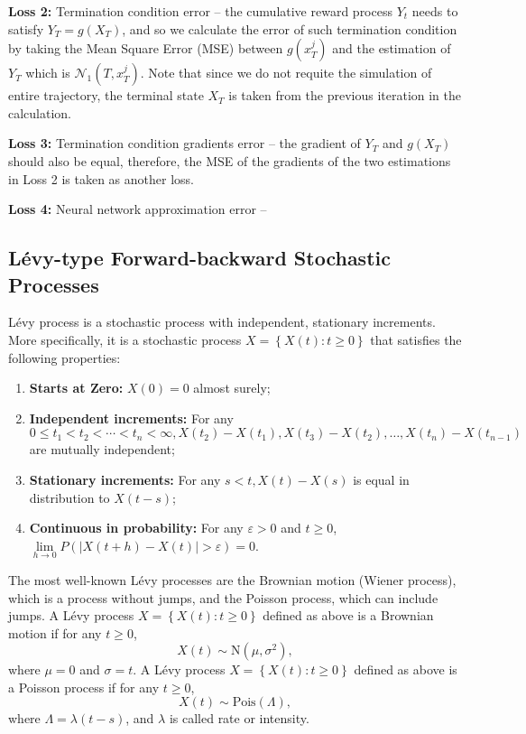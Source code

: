 \documentclass[12pt,letterpaper,oneside]{article}
\begin{document}
	\textbf{Loss 2: } Termination condition error -- the cumulative reward process $ Y_t $ needs to satisfy $ Y_T = g(X_T) $, and so we calculate the error of such termination condition by taking the Mean Square Error (MSE) between $ g(x_T^j) $ and the estimation of $ Y_T $ which is $ \mathcal{N}_1(T,x_T^j) $. Note that since we do not requite the simulation of entire trajectory, the terminal state $ X_T $ is taken from the previous iteration in the calculation. 
	
	\textbf{Loss 3: } Termination condition gradients error -- the gradient of $ Y_T $ and $ g(X_T) $ should also be equal, therefore, the MSE of the gradients of the two estimations in Loss 2 is taken as another loss.
	
	\textbf{Loss 4: } Neural network approximation error -- 
	
	
\subsection{L\'evy-type Forward-backward Stochastic Processes}
	L\'evy process is a stochastic process with independent, stationary increments. More specifically, it is a stochastic process $X=\left\{X(t): t \geq 0\right\}$ that satisfies the following properties:
	\begin{enumerate}
		\item \textbf{Starts at Zero: }$X(0)=0$ almost surely;
		\item \textbf{Independent increments: }For any $0 \leq t_1<t_2<\cdots<t_n<\infty, X(t_2)-X(t_1), X(t_3)-X(t_2), \ldots, X(t_n)-X(t_{n-1})$ are mutually independent;
		\item \textbf{Stationary increments: }For any $s<t, X(t)-X(s)$ is equal in distribution to $X(t-s)$;
		\item \textbf{Continuous in probability: }For any $\varepsilon>0$ and $t \geq 0$, $\lim \limits_{h \rightarrow 0} P\left(\left|X(t+h)-X(t)\right|>\varepsilon\right)=0$.
	\end{enumerate}
	 The most well-known L\'evy processes are the Brownian motion (Wiener process), which is a process without jumps, and the Poisson process, which can include jumps. A L\'evy process $X=\left\{X(t): t \geq 0\right\}$ defined as above is a Brownian motion if for any $t\ge 0$,
	 $$ X(t) \sim \text{N}(\mu, \sigma^2), $$
	 where $ \mu = 0 $ and $ \sigma = t $.
	 A L\'evy process $X=\left\{X(t): t \geq 0\right\}$ defined as above is a Poisson process if for any $t\ge 0$,
	 $$ X(t) \sim \text{Pois}(\Lambda), $$ 
	 where $ \Lambda = \lambda(t-s) $, and $ \lambda $ is called rate or intensity.
	 
\end{document}
